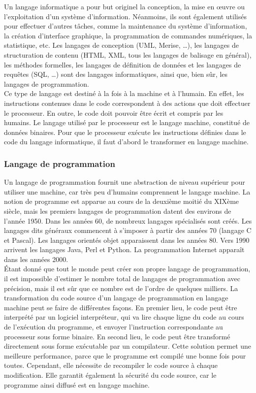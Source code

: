 Un langage informatique a pour but originel la conception, la mise en œuvre ou l’exploitation d’un système d’information. Néanmoins, ils sont également utilisés pour effectuer d’autres tâches, comme la maintenance du système d’information, la création d’interface graphique, la programmation de commandes numériques, la statistique, etc. Les langages de conception (UML, Merise, …), les langages de structuration de contenu (HTML, XML, tous les langages de balisage en général), les méthodes formelles, les langages de définition de données et les langages de requêtes (SQL, …) sont des langages informatiques, ainsi que, bien sûr, les langages de programmation.\\

Ce type de langage est destiné à la fois à la machine et à l’humain. En effet, les instructions contenues dans le code correspondent à des actions que doit effectuer le processeur. \cite{bib_infoclick} En outre, le code doit pouvoir être écrit et compris par les humains. Le langage utilisé par le processeur est le langage machine, constitué de données binaires. Pour que le processeur exécute les instructions définies dans le code du langage informatique, il faut d’abord le transformer en langage machine.

\subsubsection{Langage de programmation}

Un langage de programmation fournit une abstraction de niveau supérieur pour utiliser une machine, car très peu d’humains comprennent le langage machine. La notion de programme est apparue au cours de la deuxième moitié du XIXème siècle, mais les premiers langages de programmation datent des environs de l’année 1950. Dans les années 60, de nombreux langages spécialisés sont créés. Les langages dits généraux commencent à s’imposer à partir des années 70 (langage C et Pascal). Les langages orientés objet apparaissent dans les années 80. Vers 1990 arrivent les langages Java, Perl et Python. \cite{bib_knuth} La programmation Internet apparaît dans les années 2000.\\

Étant donné que tout le monde peut créer son propre langage de programmation, il est impossible d’estimer le nombre total de langages de programmation avec précision, mais il est sûr que ce nombre est de l’ordre de quelques milliers. \cite{bib_scriptol} \cite{bib_dowek} La transformation du code source d’un langage de programmation en langage machine peut se faire de différentes façons. En premier lieu, le code peut être interprété par un logiciel interpréteur, qui va lire chaque ligne du code au cours de l’exécution du programme, et envoyer l’instruction correspondante au processeur sous forme binaire. En second lieu, le code peut être transformé directement sous forme exécutable par un compilateur. Cette solution permet une meilleure performance, parce que le programme est compilé une bonne fois pour toutes. Cependant, elle nécessite de recompiler le code source à chaque modification. Elle garantit également la sécurité du code source, car le programme ainsi diffusé est en langage machine.\\

